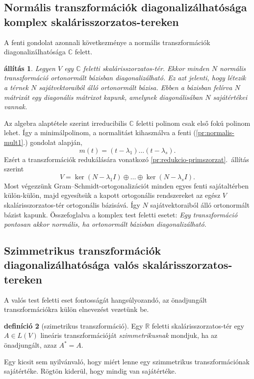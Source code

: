 \documentclass[9pt, a4paper, showtrims]{memoir}
\makeatletter
\renewenvironment{proof}[1][\proofname]
    {\par\pushQED{\qed}%
    \normalfont \topsep6\p@\@plus6\p@\relax
    \trivlist
    \item[\hskip\labelsep
        \itshape
    #1\@addpunct{:}]\ignorespaces}
    {\popQED\endtrivlist\@endpefalse}
\theoremstyle{plain}
\newtheorem{proposition}{állítás}[chapter]
\theoremstyle{remark}
\theoremstyle{definition}
\newtheorem{definition}[proposition]{definíció}
\makeatother
\begin{document}
\subsection{Normális transzformációk diagonalizálhatósága komplex skalárisszorzatos-tereken}
A fenti gondolat azonnali következménye a normális transzformációk diagonalizálhatósága $\mathbb{C}$ felett.
\begin{proposition}
    Legyen $V$ egy $\mathbb{C}$ feletti skalárisszorzatos-tér.
    Ekkor minden $N$ normális transzformáció ortonormált bázisban diagonalizálható.
    Ez azt jelenti, hogy létezik a térnek $N$ sajátvektoraiból álló ortonormált bázisa.
    Ebben a bázisban felírva $N$ mátrixát egy diagonális mátrixot kapunk,
    amelynek diagonálisában $N$ sajátértékei vannak.
\end{proposition}
\begin{proof}
    Az algebra alaptétele szerint irreducibilis $\mathbb{C}$ feletti polinom
    csak első fokú polinom lehet.
    Így a minimálpolinom, a normalitást kihasználva a fenti (\ref{pr:normalis-mult1}.) gondolat alapján,
    \[
        m\left( t \right)=\left( t-\lambda_1 \right)\dots\left( t-\lambda_s \right).
    \]
    Ezért a transzformációk redukálására vonatkozó \ref{pr:redukcio-primszorzat}.~állítás szerint
    \[
        V=\ker\left( N-\lambda_1I \right)\oplus\dots\oplus\ker\left( N-\lambda_sI \right).
    \]
    Most végezzünk Gram--Schmidt-ortogonalizációt 
    minden egyes fenti sajátaltérben külön-külön,
    majd egyesítsük a kapott ortogonális rendszereket az egész $V$ skalárisszorzatos-tér ortogonális bázisává.
    Így $N$ sajátvektoraiból álló ortonormált bázist kapunk.
\end{proof}
Összefoglalva a komplex test feletti esetet: 
\emph{
    Egy transzformáció pontosan akkor normális, 
ha ortonormált bázisban diagonalizálható.
}

\subsection{Szimmetrikus transzformációk diagonalizálhatósága valós skalárisszorzatos-tereken}
A valós test feletti eset fontosságát hangsúlyozandó, 
az önadjungált transzformációkra külön elnevezést vezetünk be.
\begin{definition}[szimetrikus transzformáció]
    Egy $\mathbb{R}$ feletti skalárisszorzatos-tér egy $A\in L\left( V \right)$ lineáris transzformációját
    \emph{szimmetrikusnak} mondjuk, ha az önadjungált, azaz  $A^\ast=A$.
\end{definition}
Egy kicsit sem nyilvánvaló, hogy miért lenne egy szimmetrikus transzformációnak sajátértéke.
Rögtön kiderül, hogy mindig van sajátértéke.
\end{document}
